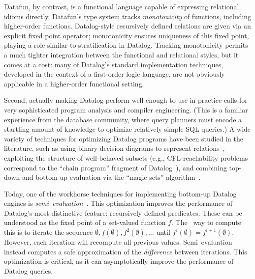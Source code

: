 
Datafun, by contrast, is a functional language capable of expressing relational
idioms directly.
%
Datafun's type system tracks \emph{monotonicity} of functions, including
higher-order functions.
%
Datalog-style recursively defined relations are given via an explicit fixed
point operator; monotonicity ensures uniqueness of this fixed point, playing a
role similar to stratification in Datalog.
%
Tracking monotonicity permits a much tighter integration between the functional
and relational styles, but it comes at a cost: many of Datalog's standard
implementation techniques, developed in the context of a first-order logic
language, are not obviously applicable in a higher-order functional setting.

Second, actually making Datalog perform well enough to use in practice
calls for very sophisticated program analysis and compiler
engineering. (This is a familiar experience from the database
community, where query planners must encode a startling amount of
knowledge to optimize relatively simple SQL queries.) A wide variety
of techniques for optimizing Datalog programs have been studied in the
literature, such as using binary decision diagrams to represent
relations~\cite{whaley-phd}, exploiting the structure of well-behaved
subsets (e.g., CFL-reachability problems correspond to the ``chain
program'' fragment of Datalog~\cite{chain-programs}), and combining
top-down and bottom-up evaluation via the ``magic sets''
algorithm~\cite{magic-sets}.

Today, one of the workhorse techniques for implementing bottom-up
Datalog engines is \emph{semi\naive\ evaluation}~\cite{seminaive}.
This optimization improves the performance of Datalog's most
distinctive feature: recursively defined predicates. These can be
understood as the fixed point of a set-valued function $f$. The
\naive\ way to compute this is to iterate the sequence $\emptyset,
f(\emptyset), f^2(\emptyset), \dots$ until $f^i(\emptyset) =
f^{i+1}(\emptyset)$. However, each iteration will recompute all
previous values. Semi\naive\ evaluation instead computes a safe
approximation of the \emph{difference} between iterations. This
optimization is critical, as it can asymptotically improve the
performance of Datalog queries.

